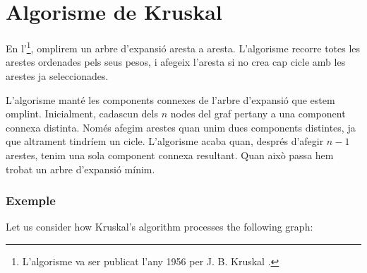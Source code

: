 \section{Algorisme de Kruskal}


En l'\footnote{L'algorisme va ser publicat
l'any 1956 per J. B. Kruskal \cite{kru56}.}, omplirem un arbre
d'expansió aresta a aresta. L'algorisme recorre totes les arestes
ordenades pels seus pesos, i afegeix l'aresta si no crea cap cicle amb
les arestes ja seleccionades.

L'algorisme manté les components connexes de l'arbre d'expansió que
estem omplint. Inicialment, cadascun dels $n$ nodes del graf pertany a
una component connexa distinta. Només afegim arestes quan unim dues
components distintes, ja que altrament tindríem un cicle. L'algorisme
acaba quan, després d'afegir $n-1$ arestes, tenim una sola component
connexa resultant. Quan això passa hem trobat un arbre d'expansió
mínim.

\subsubsection{Exemple}


\begin{samepage}
Let us consider how Kruskal's algorithm processes the
following graph:
\begin{center}
\end{center}
\end{samepage}



